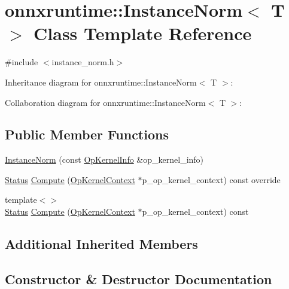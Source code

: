 \hypertarget{classonnxruntime_1_1InstanceNorm}{}\section{onnxruntime\+:\+:Instance\+Norm$<$ T $>$ Class Template Reference}
\label{classonnxruntime_1_1InstanceNorm}


{\ttfamily \#include $<$instance\+\_\+norm.\+h$>$}



Inheritance diagram for onnxruntime\+:\+:Instance\+Norm$<$ T $>$\+:


Collaboration diagram for onnxruntime\+:\+:Instance\+Norm$<$ T $>$\+:
\subsection*{Public Member Functions}
\begin{DoxyCompactItemize}
\item 
\mbox{\hyperlink{classonnxruntime_1_1InstanceNorm_afc4da4e9b0bce97ab4f6527d8297a1e4}{Instance\+Norm}} (const \mbox{\hyperlink{classonnxruntime_1_1OpKernelInfo}{Op\+Kernel\+Info}} \&op\+\_\+kernel\+\_\+info)
\item 
\mbox{\hyperlink{classonnxruntime_1_1common_1_1Status}{Status}} \mbox{\hyperlink{classonnxruntime_1_1InstanceNorm_a2e2125780530aa940c2b9271df4ed19d}{Compute}} (\mbox{\hyperlink{classonnxruntime_1_1OpKernelContext}{Op\+Kernel\+Context}} $\ast$p\+\_\+op\+\_\+kernel\+\_\+context) const override
\item 
{\footnotesize template$<$$>$ }\\\mbox{\hyperlink{classonnxruntime_1_1common_1_1Status}{Status}} \mbox{\hyperlink{classonnxruntime_1_1InstanceNorm_a218e0c164329c615361772b37086f8ad}{Compute}} (\mbox{\hyperlink{classonnxruntime_1_1OpKernelContext}{Op\+Kernel\+Context}} $\ast$p\+\_\+op\+\_\+kernel\+\_\+context) const
\end{DoxyCompactItemize}
\subsection*{Additional Inherited Members}


\subsection{Constructor \& Destructor Documentation}
\mbox{\label{classonnxruntime_1_1InstanceNorm_afc4da4e9b0bce97ab4f6527d8297a1e4}} 

